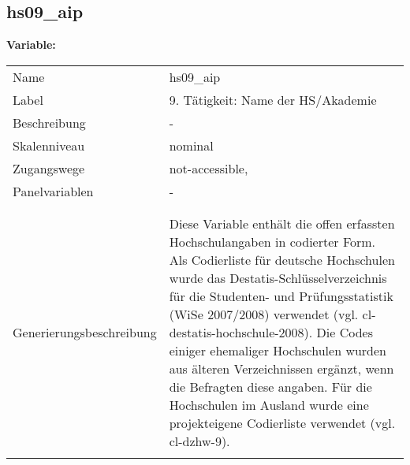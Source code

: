 	
	
	\subsection{hs09\_aip}
	\label{subSection:hs09_aip}

	\noindent\textbf{Variable:}\\
		\begin{tabular}{lL{11.3cm}}
			\label{tableVariable:hs09_aip}
			Name & hs09\_aip \\
			Label & 9. Tätigkeit: Name der HS/Akademie \\
			Beschreibung & - \\
			Skalenniveau & nominal \\
			Zugangswege &
				not-accessible,
 \\
			Panelvariablen & -
			 \\
			 \\
 \\
					Generierungsbeschreibung & Diese Variable enthält die offen erfassten Hochschulangaben in codierter Form. Als Codierliste für deutsche Hochschulen wurde das Destatis-Schlüsselverzeichnis für die Studenten- und Prüfungsstatistik (WiSe 2007/2008) verwendet (vgl. cl-destatis-hochschule-2008). Die Codes einiger ehemaliger Hochschulen wurden aus älteren Verzeichnissen ergänzt, wenn die Befragten diese angaben. Für die Hochschulen  im Ausland wurde eine projekteigene Codierliste verwendet (vgl. cl-dzhw-9). 
				 \\	
			 \\
		\end{tabular}






	
	\newpage
